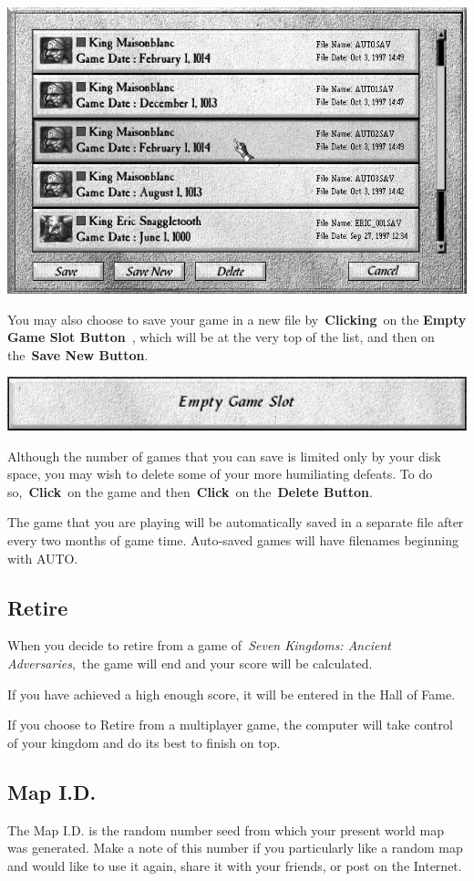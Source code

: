 \begin{center}
	\includegraphics[width=0.7\linewidth]{Isavegame}
\end{center}

You may also choose to save your game in a new file by \textbf{Clicking} on the \textbf{Empty Game Slot Button} , which will be at the very top of the list, and then on the \textbf{Save New Button}.

\begin{center}
	\includegraphics[width=0.7\linewidth]{Isavegame_emptyslot}
\end{center}

Although the number of games that you can save is limited only by your disk space, you may wish to delete some of your more humiliating defeats. To do so, \textbf{Click} on the game and then \textbf{Click} on the \textbf{Delete Button}.

The game that you are playing will be automatically saved in a separate file after every two months of game time. Auto-saved games will have filenames beginning with AUTO.

\subsection{Retire}

When you decide to retire from a game of \textit{Seven Kingdoms: Ancient Adversaries}, the game will end and your score will be calculated.

If you have achieved a high enough score, it will be entered in the Hall of Fame.

If you choose to Retire from a multiplayer game, the computer will take control of your kingdom and do its best to finish on top.

\subsection{Map I.D.}

The Map I.D. is the random number seed from which your present world map was generated. Make a note of this number if you particularly like a random map and would like to use it again, share it with your friends, or post on the Internet.